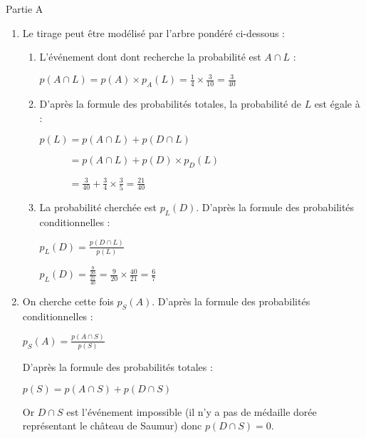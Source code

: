 \begin{corrige}
     \begin{h3}Partie A\end{h3}
     \begin{enumerate}
          \item
          Le tirage peut être modélisé par l'arbre pondéré ci-dessous :

\begin{center}
\end{center}

          \begin{enumerate}[label=\alph*.]
               \item
               L'événement dont dont recherche la probabilité est $A \cap L$ :
               \par
               $p(A \cap L)=p(A) \times p_A(L)=\frac{1}{4} \times \frac{3}{10}=\frac{3}{40}$
               \item
               D'après la formule des probabilités totales, la probabilité de $L$ est égale à :
               \par
               $p(L)=p(A \cap L)+p(D \cap L)$
               \par
               $\phantom{p(L)}=p(A \cap L)+p(D) \times p_D(L)$
               \par
               $\phantom{p(L)}=\frac{3}{40}+\frac{3}{4}\times \frac{3}{5}=\frac{21}{40}$
               \item
               La probabilité cherchée est $p_L(D)$. D'après la formule des probabilités conditionnelles :
               \par
               $p_L(D)=\frac{p(D \cap L)}{p(L)}$
               \par
               $p_L(D)=\frac{\frac{9}{20}}{\frac{21}{40}}=\frac{9}{20} \times \frac{40}{21}=\frac{6}{7}$
          \end{enumerate}
          \item
          On cherche cette fois $p_S(A)$. D'après la formule des probabilités conditionnelles :
          \par
          $p_S(A)=\frac{p(A \cap S)}{p(S)}$
          \par
          D'après la formule des probabilités totales :
          \par
          $p(S)=p(A \cap S) + p(D \cap S)$
          \par
          Or $D \cap S$ est l'événement impossible (il n'y a pas de médaille dorée représentant le château de Saumur) donc $p(D \cap S)=0$.

\end{enumerate}
\end{corrige}
